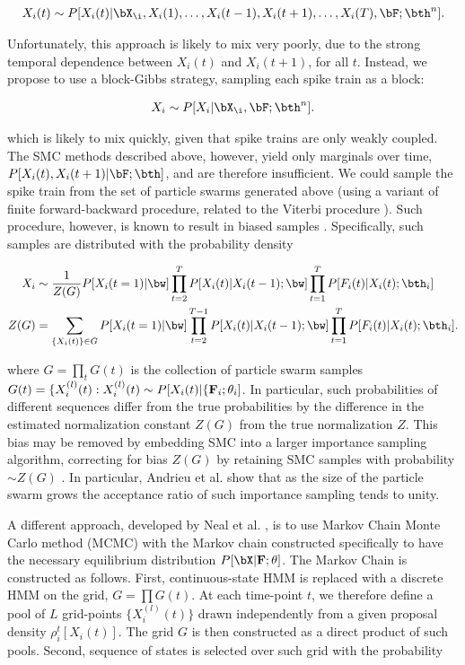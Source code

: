 \begin{align}
	X_i(t) \sim P[X_i(t) | \bX_{\i}, X_i(1), \ldots, X_i(t-1), X_i(t+1), \ldots, X_i(T), \bF; \bth^n].
\end{align} 

\noindent Unfortunately, this approach is likely to mix very poorly, due to the strong temporal dependence between $X_i(t)$ and $X_i(t+1)$, for all $t$.  Instead, we propose to use a block-Gibbs strategy, sampling each spike train as a block:

\begin{align}
	X_i \sim P[X_i | \bX_{\i}, \bF; \bth^n].
\end{align} 

\noindent which is likely to mix quickly, given that spike trains are only weakly coupled. The SMC methods described above, however, yield only marginals over time, $P[X_i(t), X_i(t+1) | \bF; \bth]$, and are therefore insufficient.  We could sample the spike train from the set of particle swarms generated above (using a variant of finite forward-backward procedure, related to the Viterbi procedure \cite{RAB89}).  Such procedure, however, is known to result in biased samples \cite{Andrieu2007, NBR03}.  Specifically, such samples are distributed with the probability density

\begin{align}
X_i &\sim \frac{1}{Z(G)} P[X_i(t=1)| \bw]\prod\limits_{t=2}^{T}P[X_i(t)| X_i(t-1); \bw] \prod_{t=1}^{T} P[F_i(t)|X_i(t); \bth_i] \\
Z(G) &= \sum_{\{X_i(t)\}\in G} P[X_i(t=1)| \bw] \prod_{t=2}^{T-1}P[X_i(t)|X_i(t-1); \bw] \prod_{t=1}^{T}P[F_i(t)|X_i(t); \bth_i].
\end{align}

\noindent where $G=\prod\limits_t G(t)$ is the collection of particle swarm samples $G(t)=\{X_i^{(l)}(t):  X_i^{(l)}(t) \sim P[X_i(t)|\{{\bf F}_i;\theta_i]$.  In particular, such probabilities of different sequences differ from the true probabilities by the difference in the estimated normalization constant $Z(G)$ from the true normalization $Z$.  This bias may be removed by embedding SMC into a larger importance sampling algorithm, correcting for bias $Z(G)$ by retaining SMC samples with probability $\sim Z(G)$ \cite{Andrieu2007}. In particular, Andrieu et al. \cite{Andrieu2007} show that as the size of the particle swarm grows the acceptance ratio of such importance sampling tends to unity.

A different approach, developed by Neal et al. \cite{NBR03}, is to use Markov Chain Monte Carlo method (MCMC) with the Markov chain constructed specifically to have the necessary equilibrium distribution $P[\bX| {\bf F}; \theta]$. The Markov Chain is constructed as follows. First, continuous-state HMM is replaced with a discrete HMM on the grid, $G=\prod G(t)$. At each time-point $t$, we therefore define a pool of $L$ grid-points $\{X_i^{(l)}(t)\}$ drawn independently from a given proposal density $\rho_i^t[X_i(t)]$. The grid $G$ is then constructed as a direct product of such pools.  Second, sequence of states is selected over such grid with the probability

